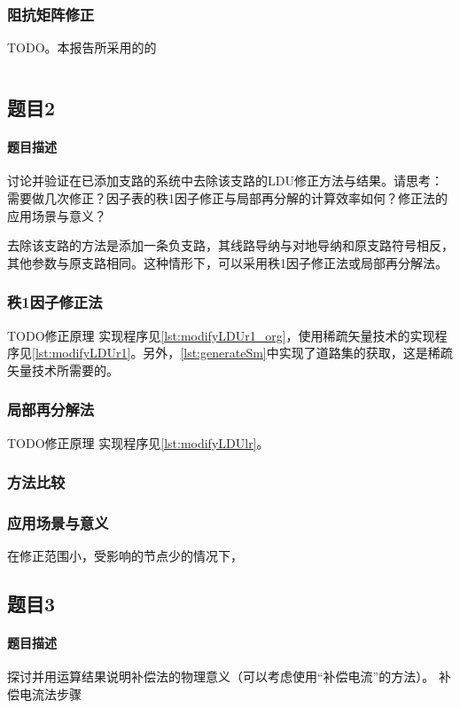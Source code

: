 \documentclass[a4paper,12pt]{article}
\begin{document}
    \subsubsection{阻抗矩阵修正}
    TODO。本报告所采用的的
    \begin{lstlisting}[language=matlab,label=lst:q2q1p2,caption={阻抗矩阵修正程序}]
    \end{lstlisting}
    \subsection{题目2}
    \paragraph{题目描述} 讨论并验证在已添加支路的系统中去除该支路的LDU修正方法与结果。请思考：需要做几次修正？因子表的秩1因子修正与局部再分解的计算效率如何？修正法的应用场景与意义？

    去除该支路的方法是添加一条负支路，其线路导纳与对地导纳和原支路符号相反，其他参数与原支路相同。这种情形下，可以采用秩1因子修正法或局部再分解法。

    \subsubsection{秩1因子修正法}
    TODO修正原理
    实现程序见\cref{lst:modifyLDUr1_org}，使用稀疏矢量技术的实现程序见\cref{lst:modifyLDUr1}。另外，\cref{lst:generateSm}中实现了道路集的获取，这是稀疏矢量技术所需要的。
    \subsubsection{局部再分解法}
    TODO修正原理
    实现程序见\cref{lst:modifyLDUlr}。
    \subsubsection{方法比较}

    \subsubsection{应用场景与意义}
    在修正范围小，受影响的节点少的情况下，

    \subsection{题目3}
    \paragraph{题目描述} 探讨并用运算结果说明补偿法的物理意义（可以考虑使用“补偿电流”的方法）。
    补偿电流法步骤
    
\end{document}
